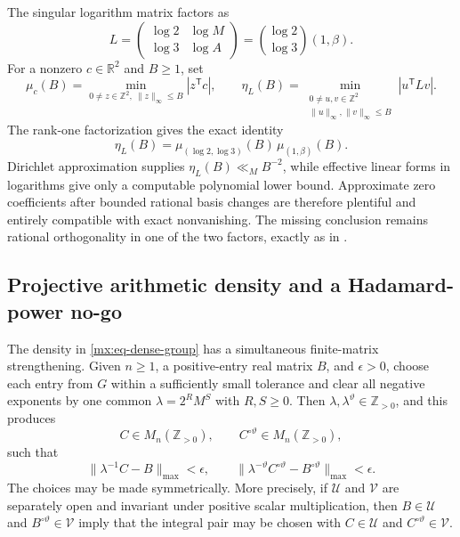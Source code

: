 \documentclass[11pt,oneside]{article}
\theoremstyle{definition}
\theoremstyle{remark}
\newcommand{\Z}{\mathbb Z}
\newcommand{\R}{\mathbb R}
\newcommand{\thetaq}{\vartheta}
\newcommand{\lean}[1]{\texttt{\detokenize{#1}}}
\begin{document}
The singular logarithm matrix factors as
\[
 L=\begin{pmatrix}\log2&\log M\\ \log3&\log A\end{pmatrix}
 =\binom{\log2}{\log3}(1,\beta).
\]
For a nonzero $c\in\R^2$ and $B\ge1$, set
\[
 \mu_c(B)=\min_{0\ne z\in\Z^2,\ \|z\|_\infty\le B}|z^{\mathsf T}c|,
 \qquad
 \eta_L(B)=\min_{\substack{0\ne u,v\in\Z^2\\
   \|u\|_\infty,\|v\|_\infty\le B}}|u^{\mathsf T}Lv|.
\]
The rank-one factorization gives the exact identity
\begin{equation}
 \eta_L(B)=
 \mu_{(\log2,\log3)}(B)\,\mu_{(1,\beta)}(B).
 \label{mx:eq-bilinear-minimum}
\end{equation}
Dirichlet approximation supplies $\eta_L(B)\ll_M B^{-2}$, while effective linear forms in
logarithms give only a computable polynomial lower bound.  Approximate zero coefficients after
bounded rational basis changes are therefore plentiful and entirely compatible with exact
nonvanishing.  The missing conclusion remains rational orthogonality in one of the two
factors, exactly as in \lean{RestrictedMatrixCoefficient}.

\subsection{Projective arithmetic density and a Hadamard-power no-go}
\label{mx:projective-density}

The density in \eqref{mx:eq-dense-group} has a simultaneous finite-matrix strengthening.
Given $n\ge1$, a positive-entry real matrix $B$, and $\epsilon>0$, choose each entry from
$G$ within a sufficiently small tolerance and clear all negative exponents by one common
$\lambda=2^RM^S$ with $R,S\ge0$.  Then
$\lambda,\lambda^{\thetaq}\in\Z_{>0}$, and this produces
\begin{equation}
 C\in M_n(\Z_{>0}),\qquad C^{\circ\thetaq}\in M_n(\Z_{>0}),
 \label{mx:eq-integral-hadamard-pair}
\end{equation}
such that
\begin{equation}
 \|\lambda^{-1}C-B\|_{\max}<\epsilon,
 \qquad
 \|\lambda^{-\thetaq}C^{\circ\thetaq}-B^{\circ\thetaq}\|_{\max}<\epsilon.
 \label{mx:eq-projective-density}
\end{equation}
The choices may be made symmetrically.  More precisely, if $\mathcal U$ and $\mathcal V$ are
separately open and invariant under positive scalar multiplication, then
$B\in\mathcal U$ and $B^{\circ\thetaq}\in\mathcal V$ imply that the integral pair may be
chosen with $C\in\mathcal U$ and $C^{\circ\thetaq}\in\mathcal V$.
\end{document}
